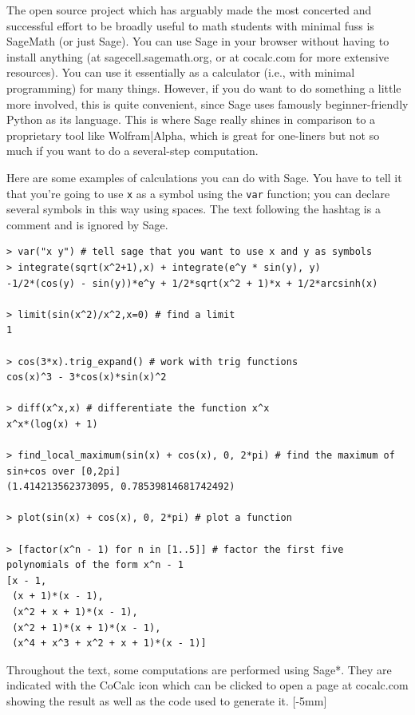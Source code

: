 \documentclass{watsonbook}
\begin{document}
  The open source project which has arguably made the most concerted
  and successful effort to be broadly useful to math students with
  minimal fuss is SageMath (or just Sage). You can use Sage in your
  browser without having to install anything (at
  sagecell.sagemath.org, or at cocalc.com for more extensive
  resources). You can use it essentially as a calculator (i.e., with
  minimal programming) for many things. However, if you do want to do
  something a little more involved, this is quite convenient, since
  Sage uses famously beginner-friendly Python as its language. This is
  where Sage really shines in comparison to a proprietary tool like
  Wolfram|Alpha, which is great for one-liners but not so much if you
  want to do a several-step computation.

  Here are some examples of calculations you can do with Sage. You
  have to tell it that you're going to use \texttt{x} as a symbol
  using the \texttt{var} function; you can declare several symbols in
  this way using spaces. The text following the hashtag is a comment
  and is ignored by Sage. 

\begin{lstlisting}
> var("x y") # tell sage that you want to use x and y as symbols
> integrate(sqrt(x^2+1),x) + integrate(e^y * sin(y), y)
-1/2*(cos(y) - sin(y))*e^y + 1/2*sqrt(x^2 + 1)*x + 1/2*arcsinh(x)

> limit(sin(x^2)/x^2,x=0) # find a limit
1

> cos(3*x).trig_expand() # work with trig functions
cos(x)^3 - 3*cos(x)*sin(x)^2

> diff(x^x,x) # differentiate the function x^x
x^x*(log(x) + 1)

> find_local_maximum(sin(x) + cos(x), 0, 2*pi) # find the maximum of sin+cos over [0,2pi]
(1.414213562373095, 0.78539814681742492)

> plot(sin(x) + cos(x), 0, 2*pi) # plot a function

> [factor(x^n - 1) for n in [1..5]] # factor the first five polynomials of the form x^n - 1
[x - 1,
 (x + 1)*(x - 1),
 (x^2 + x + 1)*(x - 1),
 (x^2 + 1)*(x + 1)*(x - 1),
 (x^4 + x^3 + x^2 + x + 1)*(x - 1)]
\end{lstlisting}

Throughout the text, some computations are performed using Sage*. They
are indicated with the CoCalc icon
\href{http://cocalc.com}{\cocalc} which can be clicked to
open a page at cocalc.com showing the result as well as the
code used to generate it. [-5mm]
\end{document}
